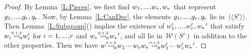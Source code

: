 \documentclass{amsart}
\numberwithin{equation}{section}
\theoremstyle{plain}
\theoremstyle{definition}
\newcounter{ITEM}
\begin{document}
\begin{proof}
By Lemma~\ref{L:Pieces}, we first find ${w}_1 {, ...\hspace{0.2ex},} {w}_{r}, {{w}_{\hspace{-0.1ex}*\hspace{0.2ex}}}$ that represent~${g}_1 {, ...\hspace{0.2ex},} {g}_{r}, {{g}_{\hspace{-0.2ex}*\hspace{0.2ex}}}$. Now, by Lemma~\ref{L:CanDec}, the elements ${g}_1 {, ...\hspace{0.2ex},} {g}_{r}, {{g}_{\hspace{-0.2ex}*\hspace{0.2ex}}}$ lie in~${\langle\!\langle{{{S}'}}\rangle\!\rangle}$. Then Lemma~\ref{L:Subgroup}{\setcounter{ITEM}{2}\leavevmode\hbox{\rm()}} implies the existence of ${w}'_1 {, ...\hspace{0.2ex},} {w}'_{r}, {{w}_{\hspace{-0.1ex}*\hspace{0.2ex}}}'$ that satisfy ${w}_{i} {\mathrel{{\mathrel{\overset{\scriptscriptstyle 0,1,2}{\rightsquigarrow}}}_{\hspace{-0.9ex}{\scriptscriptstyle R}}}} {w}'_{i}$ for ${i} = 1 {, ...\hspace{0.2ex},} {r}$ and ${{w}_{\hspace{-0.1ex}*\hspace{0.2ex}}} {\mathrel{{\mathrel{\overset{\scriptscriptstyle 0,1,2}{\rightsquigarrow}}}_{\hspace{-0.9ex}{\scriptscriptstyle R}}}} {{w}_{\hspace{-0.1ex}*\hspace{0.2ex}}}'$, and all lie in~${\mathcal{W}({{S}'})}$ in addition to the other properties. Then we have ${w} {\mathrel{{\mathrel{\overset{\scriptscriptstyle 0,1,2}{\rightsquigarrow}}}_{\hspace{-0.9ex}{\scriptscriptstyle R}}}} {w}_1 {\hspace{0.2ex}{\cdot}{\cdot}{\cdot}\hspace{0.5ex}} {w}_{r} {{w}_{\hspace{-0.1ex}*\hspace{0.2ex}}} {\mathrel{{\mathrel{\overset{\scriptscriptstyle 0,1,2}{\rightsquigarrow}}}_{\hspace{-0.9ex}{\scriptscriptstyle R}}}} {w}'_1 {\hspace{0.2ex}{\cdot}{\cdot}{\cdot}\hspace{0.5ex}} {w}'_{r} {{w}_{\hspace{-0.1ex}*\hspace{0.2ex}}}'$.
\end{proof}
\end{document}

